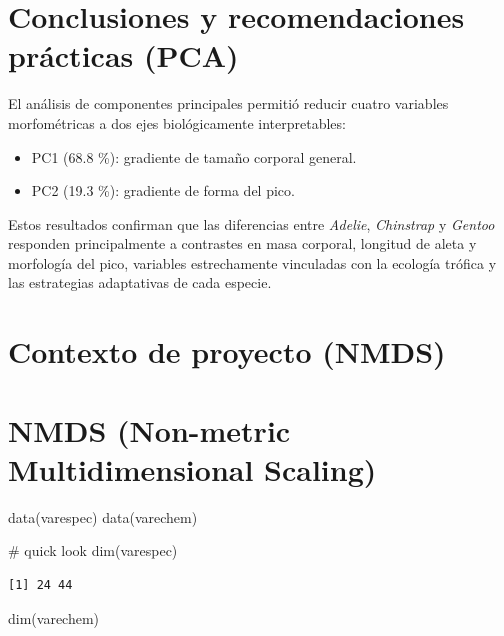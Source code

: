 \documentclass[
  spanish,
  11pt,
  a4paper,
  DIV=11,
  numbers=noendperiod]{scrartcl}
\newenvironment{Shaded}{\begin{snugshade}}{\end{snugshade}}
\newcommand{\CommentTok}[1]{\textcolor[rgb]{0.37,0.37,0.37}{#1}}
\newcommand{\FunctionTok}[1]{\textcolor[rgb]{0.28,0.35,0.67}{#1}}
\newcommand{\NormalTok}[1]{\textcolor[rgb]{0.00,0.23,0.31}{#1}}
\begin{document}
\section{Conclusiones y recomendaciones prácticas
(PCA)}\label{conclusiones-y-recomendaciones-pruxe1cticas-pca}

El análisis de componentes principales permitió reducir cuatro variables
morfométricas a dos ejes biológicamente interpretables:

\begin{itemize}
\item
  PC1 (68.8 \%): gradiente de tamaño corporal general.
\item
  PC2 (19.3 \%): gradiente de forma del pico.
\end{itemize}

Estos resultados confirman que las diferencias entre \emph{Adelie},
\emph{Chinstrap} y \emph{Gentoo} responden principalmente a contrastes
en masa corporal, longitud de aleta y morfología del pico, variables
estrechamente vinculadas con la ecología trófica y las estrategias
adaptativas de cada especie.

\section{Contexto de proyecto (NMDS)}\label{contexto-de-proyecto-nmds}

\section{NMDS (Non-metric Multidimensional
Scaling)}\label{nmds-non-metric-multidimensional-scaling}

\begin{Shaded}
\begin{Highlighting}[numbers=left,,]
\FunctionTok{data}\NormalTok{(varespec)}
\FunctionTok{data}\NormalTok{(varechem)}

\CommentTok{\# quick look}
\FunctionTok{dim}\NormalTok{(varespec)}
\end{Highlighting}
\end{Shaded}

\begin{verbatim}
[1] 24 44
\end{verbatim}

\begin{Shaded}
\begin{Highlighting}[numbers=left,,]
\FunctionTok{dim}\NormalTok{(varechem)}
\end{Highlighting}
\end{Shaded}
\end{document}
